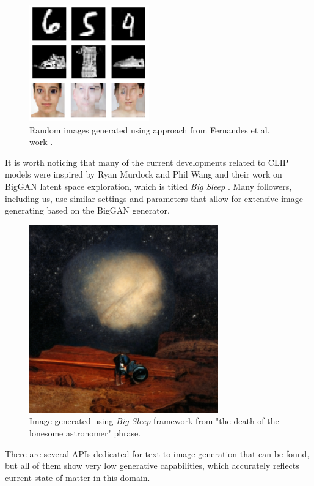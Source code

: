 \documentclass[12pt,a4paper,openany]{book}
\begin{document}
\begin{figure}[H]
    \centering
    \includegraphics[scale=1.5]{figs/coimbra.png}
    \caption{Random images generated using approach from Fernandes et al. work \cite{coimbra}.}\label{Fig:coimbra}
\end{figure}

\noindent It is worth noticing that many of the current developments related to CLIP models were inspired by Ryan Murdock and Phil Wang and their work on BigGAN latent space exploration, which is titled \textit{Big Sleep} \cite{bigsleep}. Many followers, including us, use similar settings and parameters that allow for extensive image generating based on the BigGAN generator.


\begin{figure}[H]
    \centering
    \includegraphics[scale=0.6]{figs/bigsleep.png}
    \caption{Image generated using \textit{Big Sleep} \cite{bigsleep} framework from "the death of the lonesome astronomer" phrase.}\label{Fig:BigSleep}
\end{figure}


\noindent There are several APIs dedicated for text-to-image generation that can be found, but all of them show very low generative capabilities, which accurately reflects current state of matter in this domain.
\end{document}
